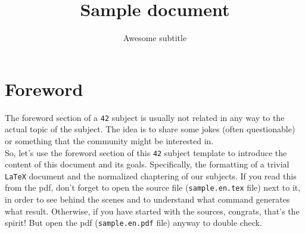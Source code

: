 \documentclass{42-en}
\begin{document}
                           \title{Sample document}
                          \subtitle{Awesome subtitle}


\maketitle

\tableofcontents


\chapter{Foreword}

    The foreword section of a \texttt{42} subject is usually not
    related in any way to the actual topic of the subject. The idea is
    to share some jokes (often questionable) or something that the
    community might be interested in.\\










    So, let's use the foreword section of this \texttt{42} subject
    template to introduce the content of this document and
    its goals. Specifically, the formatting of a trivial
    \texttt{LaTeX} document and the normalized chaptering of our
    subjects. If you read this from the pdf, don't forget to open the
    source file (\texttt{sample.en.tex} file) next to it, in
    order to see behind the scenes and to understand what command
    generates what result. Otherwise, if you have started with the
    sources, congrats, that's the spirit! But open the pdf
    (\texttt{sample.en.pdf} file) anyway to double check.\\
\end{document}
